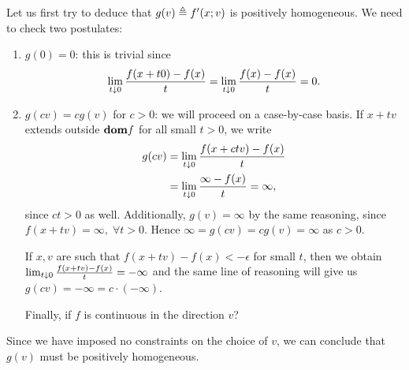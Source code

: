\documentclass[10pt]{article}
\begin{document}
\begin{Exercise}
	Let us first try to deduce that $g(v) \triangleq f'(x; v)$ is positively
	homogeneous. We need to check two postulates:
	\begin{enumerate}
		\item $g(0) = 0$: this is trivial since
			\[
				\lim_{t \downarrow 0} \frac{f(x + t 0) - f(x)}{t} =
				\lim_{t \downarrow 0} \frac{f(x) - f(x)}{t} = 0.
			\]
		\item $g(cv) = c g(v)$ for $c > 0$: we will proceed on a case-by-case basis. If $x
			+ tv$ extends outside $\textbf{dom} f$ for all small $t > 0$, we write
			\begin{align*}
				g(cv) &= \lim_{t \downarrow 0} \frac{f(x + c t v) - f(x)}{t} \\
					  &= \lim_{t \downarrow 0} \frac{\infty - f(x)}{t} = \infty,
			\end{align*}
			since $c t > 0$ as well. Additionally, $g(v) = \infty$ by the same
			reasoning, since $f(x + tv) = \infty, \; \forall t > 0$. Hence
			$\infty = g(cv) = c g(v) = \infty$ as $c > 0$.

			If $x, v$ are such that $f(x + tv) - f(x) < -\epsilon$ for small
			$t$, then we obtain $\lim_{t \downarrow 0} \frac{f(x + tv) - f(x)}{t} =
			-\infty$ and the same line of reasoning will give us
			\( g(cv) = -\infty = c \cdot (-\infty) \).

			Finally, if $f$ is continuous in the direction $v$?
	\end{enumerate}
	Since we have imposed no constraints on the choice of $v$, we can conclude
	that $g(v)$ must be positively homogeneous.


\end{Exercise}
\end{document}
